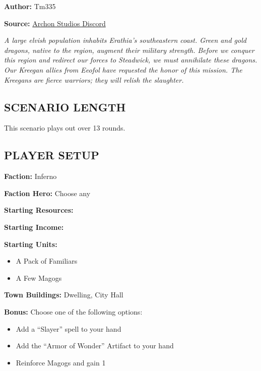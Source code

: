 
\begin{multicols*}{2}

\textbf{Author:} Tm335

\textbf{Source:} \href{https://discord.com/channels/740870068178649108/1243057664666238996/1243057664666238996}{Archon Studios Discord}

\textit{A large elvish population inhabits Erathia's southeastern coast.
  Green and gold dragons, native to the region, augment their military strength.
  Before we conquer this region and redirect our forces to Steadwick, we must annihilate these dragons.
  Our Kreegan allies from Eeofol have requested the honor of this mission.
  The Kreegans are fierce warriors; they will relish the slaughter.}

\subsection*{\MakeUppercase{Scenario length}}

This scenario plays out over 13 rounds.

\subsection*{\MakeUppercase{Player setup}}

\textbf{Faction:} Inferno

\textbf{Faction Hero:} Choose any   

\textbf{Starting Resources:}\par
{}

\textbf{Starting Income:}\par
{}

\textbf{Starting Units:}

\begin{itemize}
  \item A Pack of Familiars
  \item A Few Magogs
\end{itemize}

\textbf{Town Buildings:}  Dwelling, City Hall

\vspace*{\fill}\columnbreak

\textbf{Bonus:} Choose one of the following options: 
\begin{itemize}
  \item Add a ``Slayer'' spell to your hand
  \item Add the ``Armor of Wonder'' Artifact to your hand
  \item Reinforce Magogs and gain 1 
\end{itemize}


\end{multicols*}
